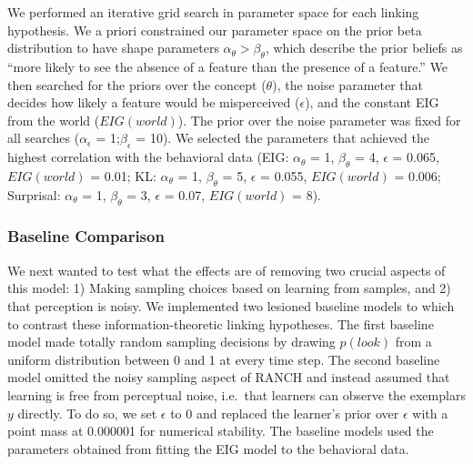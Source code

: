 \documentclass[10pt, letterpaper]{article}
\begin{document}
We performed an iterative grid search in parameter space for each
linking hypothesis. We a priori constrained our parameter space on the
prior beta distribution to have shape parameters
\(\alpha_{\theta} > \beta_{\theta}\), which describe the prior beliefs
as ``more likely to see the absence of a feature than the presence of a
feature.'' We then searched for the priors over the concept
(\(\theta\)), the noise parameter that decides how likely a feature
would be misperceived (\(\epsilon\)), and the constant EIG from the
world (\(EIG(world)\)). The prior over the noise parameter was fixed for
all searches (\(\alpha_{\epsilon}\) = 1;\(\beta_{\epsilon}\) = 10). We
selected the parameters that achieved the highest correlation with the
behavioral data (EIG: \(\alpha_{\theta}\) = 1, \(\beta_{\theta}\) = 4,
\(\epsilon\) = 0.065, \(EIG(world)\) = 0.01; KL: \(\alpha_{\theta}\) =
1, \(\beta_{\theta}\) = 5, \(\epsilon\) = 0.055, \(EIG(world)\) = 0.006;
Surprisal: \(\alpha_{\theta}\) = 1, \(\beta_{\theta}\) = 3, \(\epsilon\)
= 0.07, \(EIG(world)\) = 8).

\hypertarget{baseline-comparison}{%
\subsubsection{Baseline Comparison}\label{baseline-comparison}}

We next wanted to test what the effects are of removing two crucial
aspects of this model: 1) Making sampling choices based on learning from
samples, and 2) that perception is noisy. We implemented two lesioned
baseline models to which to contrast these information-theoretic linking
hypotheses. The first baseline model made totally random sampling
decisions by drawing \(p(look)\) from a uniform distribution between 0
and 1 at every time step. The second baseline model omitted the noisy
sampling aspect of RANCH and instead assumed that learning is free from
perceptual noise, i.e.~that learners can observe the exemplars \(y\)
directly. To do so, we set \(\epsilon\) to 0 and replaced the learner's
prior over \(\epsilon\) with a point mass at 0.000001 for numerical
stability. The baseline models used the parameters obtained from fitting
the EIG model to the behavioral data.
\end{document}
